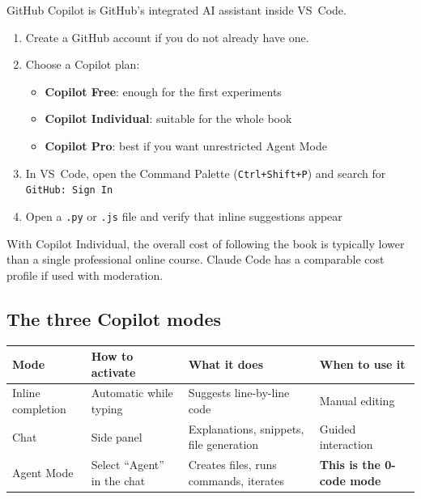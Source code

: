 GitHub Copilot is GitHub's integrated AI assistant inside VS~Code.

\begin{praticabox}[title={Hands-on --- Activating Copilot}]
\begin{enumerate}
  \item Create a GitHub account if you do not already have one.
  \item Choose a Copilot plan:
    \begin{itemize}
      \item \textbf{Copilot Free}: enough for the first experiments
      \item \textbf{Copilot Individual}: suitable for the whole book
      \item \textbf{Copilot Pro}: best if you want unrestricted Agent Mode
    \end{itemize}
  \item In VS~Code, open the Command Palette (\texttt{Ctrl+Shift+P}) and search for \texttt{GitHub: Sign In}
  \item Open a \texttt{.py} or \texttt{.js} file and verify that inline suggestions appear
\end{enumerate}
\end{praticabox}

\begin{costbox}
With Copilot Individual, the overall cost of following the book is typically lower than a single professional online course. Claude Code has a comparable cost profile if used with moderation.
\end{costbox}

\subsection{The three Copilot modes}

\begin{center}
\begin{tabularx}{\textwidth}{l l X X}
\toprule
\textbf{Mode} & \textbf{How to activate} & \textbf{What it does} & \textbf{When to use it} \\
\midrule
Inline completion & Automatic while typing & Suggests line-by-line code & Manual editing \\
Chat & Side panel & Explanations, snippets, file generation & Guided interaction \\
Agent Mode & Select ``Agent'' in the chat & Creates files, runs commands, iterates & \textbf{This is the 0-code mode} \\
\bottomrule
\end{tabularx}
\end{center}

